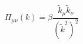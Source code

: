 \begin{equation}
\Pi_{\mu\nu}(k) = \beta\frac{\tilde k_\mu
\tilde k_\nu}{(\tilde k^2)^2} 
\end{equation}

